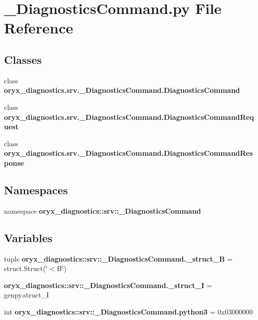\section{\-\_\-\-Diagnostics\-Command.\-py \-File \-Reference}
\label{__DiagnosticsCommand_8py}
\subsection*{\-Classes}
\begin{DoxyCompactItemize}
\item 
class {\bf oryx\-\_\-diagnostics.\-srv.\-\_\-\-Diagnostics\-Command.\-Diagnostics\-Command}
\item 
class {\bf oryx\-\_\-diagnostics.\-srv.\-\_\-\-Diagnostics\-Command.\-Diagnostics\-Command\-Request}
\item 
class {\bf oryx\-\_\-diagnostics.\-srv.\-\_\-\-Diagnostics\-Command.\-Diagnostics\-Command\-Response}
\end{DoxyCompactItemize}
\subsection*{\-Namespaces}
\begin{DoxyCompactItemize}
\item 
namespace {\bf oryx\-\_\-diagnostics\-::srv\-::\-\_\-\-Diagnostics\-Command}
\end{DoxyCompactItemize}
\subsection*{\-Variables}
\begin{DoxyCompactItemize}
\item 
tuple {\bf oryx\-\_\-diagnostics\-::srv\-::\-\_\-\-Diagnostics\-Command.\-\_\-struct\-\_\-\-B} = struct.\-Struct(\char`\"{}$<$\-B\char`\"{})
\item 
{\bf oryx\-\_\-diagnostics\-::srv\-::\-\_\-\-Diagnostics\-Command.\-\_\-struct\-\_\-\-I} = genpy.\-struct\-\_\-\-I
\item 
int {\bf oryx\-\_\-diagnostics\-::srv\-::\-\_\-\-Diagnostics\-Command.\-python3} = 0x03000000
\end{DoxyCompactItemize}

